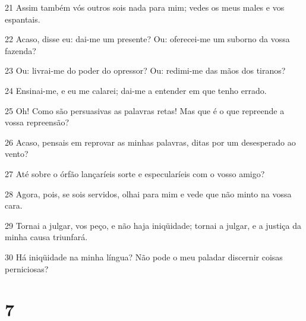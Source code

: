 \par 21 Assim também vós outros sois nada para mim; vedes os meus males e vos espantais.
\par 22 Acaso, disse eu: dai-me um presente? Ou: oferecei-me um suborno da vossa fazenda?
\par 23 Ou: livrai-me do poder do opressor? Ou: redimi-me das mãos dos tiranos?
\par 24 Ensinai-me, e eu me calarei; dai-me a entender em que tenho errado.
\par 25 Oh! Como são persuasivas as palavras retas! Mas que é o que repreende a vossa repreensão?
\par 26 Acaso, pensais em reprovar as minhas palavras, ditas por um desesperado ao vento?
\par 27 Até sobre o órfão lançaríeis sorte e especularíeis com o vosso amigo?
\par 28 Agora, pois, se sois servidos, olhai para mim e vede que não minto na vossa cara.
\par 29 Tornai a julgar, vos peço, e não haja iniqüidade; tornai a julgar, e a justiça da minha causa triunfará.
\par 30 Há iniqüidade na minha língua? Não pode o meu paladar discernir coisas perniciosas?

\chapter{7}

